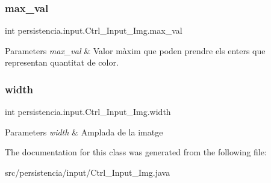 \subsubsection{\texorpdfstring{max\+\_\+val}{max\_val}}
{\footnotesize\ttfamily int persistencia.\+input.\+Ctrl\+\_\+\+Input\+\_\+\+Img.\+max\+\_\+val\hspace{0.3cm}{\ttfamily [package]}}


\begin{DoxyParams}{Parameters}
{\em max\+\_\+val} & Valor màxim que poden prendre els enters que representan quantitat de color. \\
\hline
\end{DoxyParams}
\mbox{\label{classpersistencia_1_1input_1_1Ctrl__Input__Img_a51dd0b9243b854aa25ac4532acca4524}} 
\subsubsection{\texorpdfstring{width}{width}}
{\footnotesize\ttfamily int persistencia.\+input.\+Ctrl\+\_\+\+Input\+\_\+\+Img.\+width\hspace{0.3cm}{\ttfamily [package]}}


\begin{DoxyParams}{Parameters}
{\em width} & Amplada de la imatge \\
\hline
\end{DoxyParams}


The documentation for this class was generated from the following file\+:\begin{DoxyCompactItemize}
\item 
src/persistencia/input/Ctrl\+\_\+\+Input\+\_\+\+Img.\+java\end{DoxyCompactItemize}
